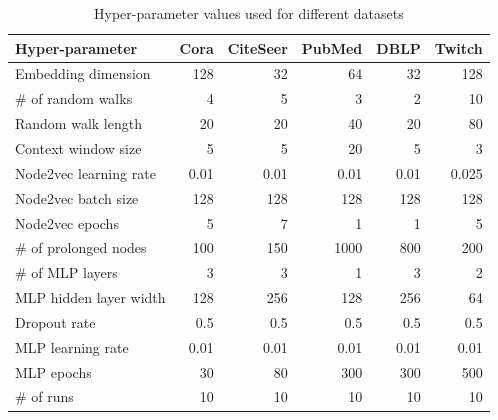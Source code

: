 \begin{table}
  \begin{center}
    \begin{minipage}{360pt} %
      \caption{Hyper-parameter values used for different datasets}
      \label{tab:hyperparameter-values}
      \begin{tabular}{lrrrrr}
        \toprule
        \textbf{Hyper-parameter} & \textbf{Cora} & \textbf{CiteSeer} & \textbf{PubMed} & \textbf{DBLP} & \textbf{Twitch} \\
        \midrule
        Embedding dimension      & 128           & 32                & 64              & 32            & 128             \\
        \# of random walks       & 4             & 5                 & 3               & 2             & 10              \\
        Random walk length       & 20            & 20                & 40              & 20            & 80              \\
        Context window size      & 5             & 5                 & 20              & 5             & 3               \\
        Node2vec learning rate   & 0.01          & 0.01              & 0.01            & 0.01          & 0.025           \\
        Node2vec batch size      & 128           & 128               & 128             & 128           & 128             \\
        Node2vec epochs          & 5             & 7                 & 1               & 1             & 5               \\
        \# of prolonged nodes    & 100           & 150               & 1000            & 800           & 200             \\
        \# of MLP layers         & 3             & 3                 & 1               & 3             & 2               \\
        MLP hidden layer width   & 128           & 256               & 128             & 256           & 64              \\
        Dropout rate             & 0.5           & 0.5               & 0.5             & 0.5           & 0.5             \\
        MLP learning rate        & 0.01          & 0.01              & 0.01            & 0.01          & 0.01            \\
        MLP epochs               & 30            & 80                & 300             & 300           & 500             \\
        \# of runs               & 10            & 10                & 10              & 10            & 10              \\
        \bottomrule
      \end{tabular}
    \end{minipage}
  \end{center}
\end{table}


